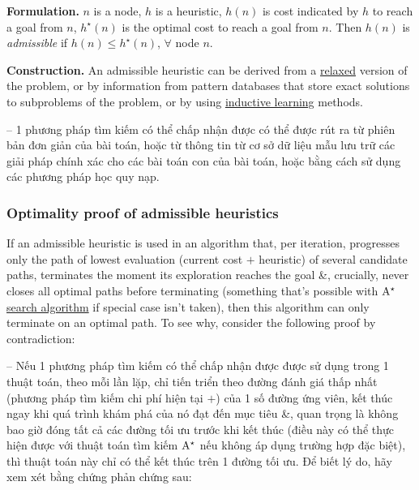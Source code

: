 \documentclass{article}
\begin{document}
{\bf Formulation.} $n$ is a node, $h$ is a heuristic, $h(n)$ is cost indicated by $h$ to reach a goal from $n$, $h^\star(n)$ is the optimal cost to reach a goal from $n$. Then $h(n)$ is {\it admissible} if $h(n)\le h^\star(n)$, $\forall$ node $n$.

{\bf Construction.} An admissible heuristic can be derived from a \href{https://en.wikipedia.org/wiki/Relaxation_(approximation)}{relaxed} version of the problem, or by information from pattern databases that store exact solutions to subproblems of the problem, or by using \href{https://en.wikipedia.org/wiki/Inductive_transfer}{inductive learning} methods.

-- 1 phương pháp tìm kiếm có thể chấp nhận được có thể được rút ra từ phiên bản đơn giản của bài toán, hoặc từ thông tin từ cơ sở dữ liệu mẫu lưu trữ các giải pháp chính xác cho các bài toán con của bài toán, hoặc bằng cách sử dụng các phương pháp học quy nạp.


\subsubsection{Optimality proof of admissible heuristics}
If an admissible heuristic is used in an algorithm that, per iteration, progresses only the path of lowest evaluation (current cost $+$ heuristic) of several candidate paths, terminates the moment its exploration reaches the goal \&, crucially, never closes all optimal paths before terminating (something that's possible with \href{https://en.wikipedia.org/wiki/A*_search_algorithm}{$\rm A^\star$ search algorithm} if special case isn't taken), then this algorithm can only terminate on an optimal path. To see why, consider the following proof by contradiction:

-- Nếu 1 phương pháp tìm kiếm có thể chấp nhận được được sử dụng trong 1 thuật toán, theo mỗi lần lặp, chỉ tiến triển theo đường đánh giá thấp nhất (phương pháp tìm kiếm chi phí hiện tại $+$) của 1 số đường ứng viên, kết thúc ngay khi quá trình khám phá của nó đạt đến mục tiêu \&, quan trọng là không bao giờ đóng tất cả các đường tối ưu trước khi kết thúc (điều này có thể thực hiện được với thuật toán tìm kiếm $\rm A^\star$ nếu không áp dụng trường hợp đặc biệt), thì thuật toán này chỉ có thể kết thúc trên 1 đường tối ưu. Để biết lý do, hãy xem xét bằng chứng phản chứng sau:
\end{document}
